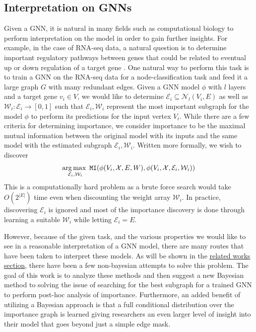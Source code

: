 \subsection{Interpretation on GNNs}
Given a GNN, it is natural in many fields such as computational biology to perform interpretation on the model in order to gain further insights. For example, in the case of RNA-seq data, a natural question is to determine important regulatory pathways between genes that could be related to eventual up or down regulation of a target gene \cite{petralia_new_2016}. One natural way to perform this task is to train a GNN on the RNA-seq data for a node-classification task and feed it a large graph $G$ with many redundant edges. Given a GNN model $\phi$ with $l$ layers and a target gene $v_{i} \in V$, we would like to determine $\mathcal{E}_{i} \subseteq \mathcal{N}_{l}(V_{i}, E)$ as well as $\mathcal{W}_{i} : \mathcal{E}_{i} \rightarrow [0,1]$ such that $\mathcal{E}_{i}, \mathcal{W}_{i}$ represent the most important subgraph for the model $\phi$ to perform its predictions for the input vertex $V_{i}$. While there are a few criteria for determining importance, we consider importance to be the maximal mutual information between the original model with its inputs and the same model with the estimated subgraph $\mathcal{E}_{i}, \mathcal{W}_{i}$. Written more formally, we wish to discover
\begin{align*}
  \operatorname*{arg\,max\,\,}_{\mathcal{E}_{i}, \mathcal{W}_{i}} \mathtt{MI}(\phi(V_{i}, \mathcal{X}, E, W), \phi(V_{i}, \mathcal{X}, \mathcal{E}_{i}, \mathcal{W}_{i}))
\end{align*}
This is a computationally hard problem as a brute force search would take $O(2^{|E|})$ time even when discounting the weight array $\mathcal{W}_{i}$. In practice, discovering $\mathcal{E}_i$ is ignored and most of the importance discovery is done through learning a suitable $\mathcal{W}_i$ while letting $\mathcal{E}_i = E$.

However, because of the given task, and the various properties we would like to see in a reasonable interpretation of a GNN model, there are many routes that have been taken to interpret these models. As will be shown in the \hyperref[sec:related]{related works section}, there have been a few non-bayesian attempts to solve this problem. The goal of this work is to analyze these methods and then suggest a new Bayesian method to solving the issue of searching for the best subgraph for a trained GNN to perform post-hoc analysis of importance. Furthermore, an added benefit of utilizing a Bayesian approach is that a full conditional distribution over the importance graph is learned giving researchers an even larger level of insight into their model that goes beyond just a simple edge mask.

